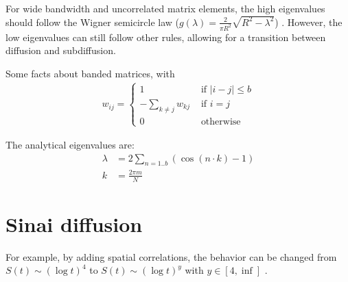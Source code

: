 For wide bandwidth and uncorrelated matrix elements, the high eigenvalues
should follow the Wigner semicircle law ($g(\lambda) = \frac{2}{\pi R^2}\sqrt{R^2-\lambda^2}$)
\cite{erdos_local_2012,fyodorov_scaling_1991,wigner_characteristic_1955}. However,
the low eigenvalues can still follow other rules, allowing for a transition
between diffusion and subdiffusion.



Some facts about banded matrices, with 
\begin{align}
  w_{ij} = 
  \begin{cases}
    1 \quad &\textrm{  if  } |i-j|\le b   \\
    -\sum_{k \ne j} w_{kj} &\textrm{  if  } i = j  \\
    0 \quad &\textrm{  otherwise }
  \end{cases}
\end{align}

The analytical eigenvalues are:
\begin{align}
  \lambda &= 2\sum_{n=1..b} (\cos(n\cdot k) -1) \\
  k &= \frac{2\pi m}{N}
\end{align}


\section{Sinai diffusion}



For example, by adding spatial correlations, the behavior can be changed 
from $S(t) \sim (\log t)^4$ to $S(t) \sim (\log t)^y$ with $y \in [4,\inf]$ \cite{stanley_generalisation_1987}.



